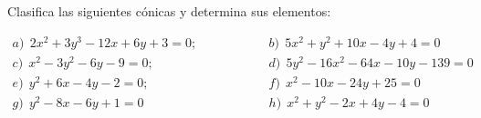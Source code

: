 \vspace{-6mm}
\begin{flushright}
\begin{tiny} \textcolor{gris}{}	
\end{tiny}
\end{flushright}

\vspace{-10mm}
\begin{flushright}
\begin{tiny} \textcolor{gris}{}	
\end{tiny}
\end{flushright}

\vspace{-10mm}
\begin{flushright}
\begin{tiny} \textcolor{gris}{}	
\end{tiny}
\end{flushright}


\begin{mipropuesto}

Clasifica las siguientes cónicas y determina sus elementos:

\vspace{4mm} 
$\begin{array}{lcl}
a)\ \ 2x^2+3y^3-12x+6y+3=0; & \qquad \qquad & b)\ \ 5x^2+y^2+10x-4y+4=0 \\
c)\ \ x^2-3y^2-6y-9=0; & \qquad \qquad & d)\ \ 5y^2-16x^2-64x-10y-139=0 \\
e)\ \ y^2+6x-4y-2=0; & \qquad \qquad & f)\ \ x^2-10x-24y+25=0 \\
g)\ \ y^2-8x-6y+1=0 & \qquad \qquad & h)\ \ x^2+y^2-2x+4y-4=0  
\end{array}$
\end{mipropuesto}

	
\vspace{-6mm}
\begin{flushright}
\begin{scriptsize} \textcolor{gris}{}	\end{scriptsize}
\end{flushright}

